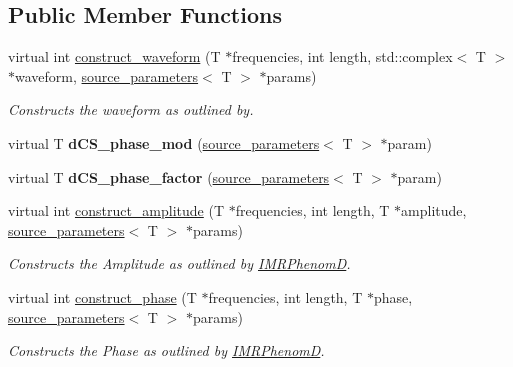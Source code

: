 \subsection*{Public Member Functions}
\begin{DoxyCompactItemize}
\item 
virtual int \hyperlink{classdCS__IMRPhenomD__log_a15ecc7dbe3cf829ac2b2067060aef0c2}{construct\+\_\+waveform} (T $\ast$frequencies, int length, std\+::complex$<$ T $>$ $\ast$waveform, \hyperlink{structsource__parameters}{source\+\_\+parameters}$<$ T $>$ $\ast$params)
\begin{DoxyCompactList}\small\item\em Constructs the waveform as outlined by. \end{DoxyCompactList}\item 
\mbox{\label{classdCS__IMRPhenomD__log_aeb35c3795b437195028551ff89029b3b}} 
virtual T {\bfseries d\+C\+S\+\_\+phase\+\_\+mod} (\hyperlink{structsource__parameters}{source\+\_\+parameters}$<$ T $>$ $\ast$param)
\item 
\mbox{\label{classdCS__IMRPhenomD__log_a6a8654bb3f33f51744819599766d6087}} 
virtual T {\bfseries d\+C\+S\+\_\+phase\+\_\+factor} (\hyperlink{structsource__parameters}{source\+\_\+parameters}$<$ T $>$ $\ast$param)
\item 
virtual int \hyperlink{classdCS__IMRPhenomD__log_a769498326cbe7738a855fc93201f6e6a}{construct\+\_\+amplitude} (T $\ast$frequencies, int length, T $\ast$amplitude, \hyperlink{structsource__parameters}{source\+\_\+parameters}$<$ T $>$ $\ast$params)
\begin{DoxyCompactList}\small\item\em Constructs the Amplitude as outlined by \hyperlink{classIMRPhenomD}{I\+M\+R\+PhenomD}. \end{DoxyCompactList}\item 
virtual int \hyperlink{classdCS__IMRPhenomD__log_a6f26f618b1ab6e41ae32eb94fefcc185}{construct\+\_\+phase} (T $\ast$frequencies, int length, T $\ast$phase, \hyperlink{structsource__parameters}{source\+\_\+parameters}$<$ T $>$ $\ast$params)
\begin{DoxyCompactList}\small\item\em Constructs the Phase as outlined by \hyperlink{classIMRPhenomD}{I\+M\+R\+PhenomD}. \end{DoxyCompactList}\end{DoxyCompactItemize}


